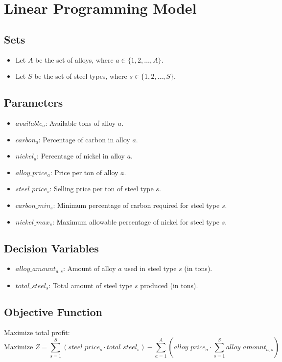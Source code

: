 \documentclass{article}
\begin{document}
\section*{Linear Programming Model}

\subsection*{Sets}
\begin{itemize}
    \item Let $A$ be the set of alloys, where $a \in \{1, 2, \ldots, A\}$.
    \item Let $S$ be the set of steel types, where $s \in \{1, 2, \ldots, S\}$.
\end{itemize}

\subsection*{Parameters}
\begin{itemize}
    \item $available_a$: Available tons of alloy $a$.
    \item $carbon_{a}$: Percentage of carbon in alloy $a$.
    \item $nickel_{a}$: Percentage of nickel in alloy $a$.
    \item $alloy\_price_{a}$: Price per ton of alloy $a$.
    \item $steel\_price_{s}$: Selling price per ton of steel type $s$.
    \item $carbon\_min_{s}$: Minimum percentage of carbon required for steel type $s$.
    \item $nickel\_max_{s}$: Maximum allowable percentage of nickel for steel type $s$.
\end{itemize}

\subsection*{Decision Variables}
\begin{itemize}
    \item $alloy\_amount_{a,s}$: Amount of alloy $a$ used in steel type $s$ (in tons).
    \item $total\_steel_{s}$: Total amount of steel type $s$ produced (in tons).
\end{itemize}

\subsection*{Objective Function}
Maximize total profit:
\[
\text{Maximize } Z = \sum_{s=1}^{S} (steel\_price_{s} \cdot total\_steel_{s}) - \sum_{a=1}^{A} (alloy\_price_{a} \cdot \sum_{s=1}^{S} alloy\_amount_{a,s})
\]
\end{document}
